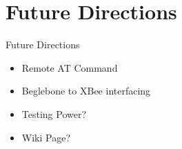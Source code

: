 \documentclass{beamer}
\begin{document}
  



  


\section{Future Directions}

\begin{frame}{Future Directions}{}
  \begin{itemize}
      \item Remote AT Command
      \item Beglebone to XBee interfacing
      \item Testing Power?
      \item Wiki Page?
  \end{itemize}
\end{frame}

\end{document}
